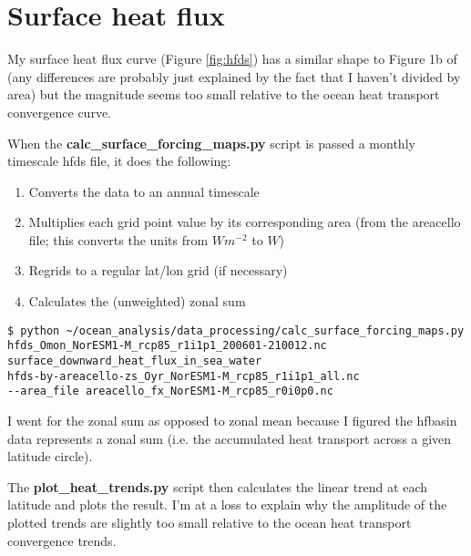 \section{Surface heat flux}

My surface heat flux curve (Figure \ref{fig:hfds}) has a similar shape to Figure 1b of \citet{Nummelin_2017} (any differences are probably just explained by the fact that I haven't divided by area) but the magnitude seems too small relative to the ocean heat transport convergence curve.

When the \textbf{calc_surface_forcing_maps.py} script is passed a monthly timescale hfds file, it does the following:
\begin{enumerate}
\item Converts the data to an annual timescale
\item Multiplies each grid point value by its corresponding area (from the areacello file; this converts the units from $Wm^{-2}$ to $W$)
\item Regrids to a regular lat/lon grid (if necessary)
\item Calculates the (unweighted) zonal sum
\end{enumerate}

\begin{verbatim}
$ python ~/ocean_analysis/data_processing/calc_surface_forcing_maps.py
hfds_Omon_NorESM1-M_rcp85_r1i1p1_200601-210012.nc 
surface_downward_heat_flux_in_sea_water 
hfds-by-areacello-zs_Oyr_NorESM1-M_rcp85_r1i1p1_all.nc 
--area_file areacello_fx_NorESM1-M_rcp85_r0i0p0.nc
\end{verbatim}

I went for the zonal sum as opposed to zonal mean because I figured the hfbasin data represents a zonal sum (i.e. the accumulated heat transport across a given latitude circle).

The \textbf{plot_heat_trends.py} script then calculates the linear trend at each latitude and plots the result. I'm at a loss to explain why the amplitude of the plotted trends are slightly too small relative to the ocean heat transport convergence trends.



